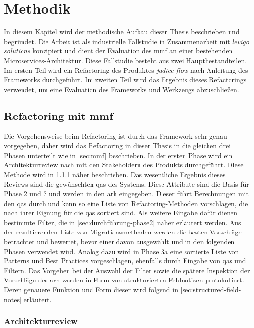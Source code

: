 \chapter{Methodik}
\label{chap:methodik}

In diesem Kapitel wird der methodische Aufbau dieser Thesis beschrieben und begründet.
Die Arbeit ist als industrielle Fallstudie in Zusammenarbeit mit \emph{levigo solutions} konzipiert und dient der Evaluation des \gls{mmf} an einer bestehenden Microservices-Architektur.
Diese Fallstudie besteht aus zwei Hauptbestandteilen.
Im ersten Teil wird ein Refactoring des Produktes \emph{jadice flow} nach Anleitung des Frameworks durchgeführt.
Im zweiten Teil wird das Ergebnis dieses Refactorings verwendet, um eine Evaluation des Frameworks und Werkzeugs abzuschließen.

\section{Refactoring mit \gls{mmf}}

Die Vorgehensweise beim Refactoring ist durch das Framework sehr genau vorgegeben, daher wird das Refactoring in dieser Thesis in die gleichen drei Phasen unterteilt wie in \cref{sec:mmf} beschrieben.
In der ersten Phase wird ein Architekturreview nach  mit den Stakeholdern des Produkts durchgeführt.
Diese Methode wird in \cref{sec:methodik-architekturreview} näher beschrieben.
Das wesentliche Ergebnis dieses Reviews sind die gewünschten \glspl{qa} des Systems.
Diese Attribute sind die Basis für Phase 2 und 3 und werden in den \gls{arh} eingegeben. 
Dieser führt Berechnungen mit den \glspl{qa} durch und kann so eine Liste von Refactoring-Methoden vorschlagen, die nach ihrer Eignung für die \glspl{qa} sortiert sind.
Als weitere Eingabe dafür dienen bestimmte Filter, die in \cref{sec:durchführung-phase2} näher erläutert werden.
Aus der resultierenden Liste von Migrationsmethoden werden die besten Vorschläge betrachtet und bewertet, bevor einer davon ausgewählt und in den folgenden Phasen verwendet wird.
Analog dazu wird in Phase 3a eine sortierte Liste von Patterns und Best Practices vorgeschlagen, ebenfalls durch Eingabe von \glspl{qa} und Filtern.
Das Vorgehen bei der Auswahl der Filter sowie die spätere Inspektion der Vorschläge des \gls{arh} werden in Form von strukturierten Feldnotizen protokolliert.
Deren genauere Funktion und Form dieser wird folgend in \cref{sec:structured-field-notes} erläutert.

\subsection{Architekturreview}
\label{sec:methodik-architekturreview}


